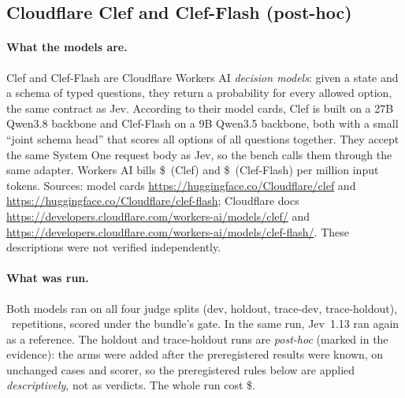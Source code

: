 \subsection{Cloudflare Clef and Clef-Flash \texorpdfstring{\screen}{[screen]} (post-hoc)}\label{sec:clef}

\paragraph{What the models are.} Clef and Clef-Flash are Cloudflare Workers AI \emph{decision models}: given a state
and a schema of typed questions, they return a probability for every allowed option, the same contract as Jev.
According to their model cards, Clef is built on a 27B Qwen3.8 backbone and Clef-Flash on a 9B Qwen3.5 backbone, both
with a small ``joint schema head'' that scores all options of all questions together. They accept the same System One
request body as Jev, so the bench calls them through the same adapter. Workers AI bills \$\ClClefPrice\ (Clef) and
\$\ClFlashPrice\ (Clef-Flash) per million input tokens. Sources: model cards
\url{https://huggingface.co/Cloudflare/clef} and \url{https://huggingface.co/Cloudflare/clef-flash}; Cloudflare docs
\url{https://developers.cloudflare.com/workers-ai/models/clef/} and
\url{https://developers.cloudflare.com/workers-ai/models/clef-flash/}. These descriptions were not verified
independently.

\paragraph{What was run.} Both models ran on all four judge splits (dev, holdout, trace-dev, trace-holdout), \HoldReps\
repetitions, scored under the bundle's gate. In the same run, Jev~1.13 ran again as a reference. The holdout and
trace-holdout runs are \emph{post-hoc} (marked \code{posthoc: true} in the evidence): the arms were added after the
preregistered results were known, on unchanged cases and scorer, so the preregistered rules below are applied
\emph{descriptively}, not as verdicts. The whole run cost \$\ClSpend.

\begin{table}[htbp]
\centering\scriptsize
\caption{Post-hoc run: Clef, Clef-Flash and the in-run Jev reference on all four splits (per-case majority over
\HoldReps\ repetitions; latency is client wall time from this Mac, network included).}
\label{tab:clefresults}

\end{table}

